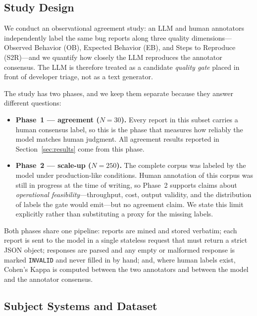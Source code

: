 \subsection{Study Design}
\label{sec:method:design}

We conduct an observational agreement study: an LLM and human
annotators independently label the same bug reports along three
quality dimensions---Observed Behavior (OB), Expected Behavior (EB),
and Steps to Reproduce (S2R)---and we quantify how closely the LLM
reproduces the annotator consensus. The LLM is therefore treated as a
candidate \emph{quality gate} placed in front of developer triage,
not as a text generator.

The study has two phases, and we keep them separate because they
answer different questions:

\begin{itemize}
  \item \textbf{Phase~1 --- agreement ($N=30$).} Every report in this
        subset carries a human consensus label, so this is the phase
        that measures how reliably the model matches human judgment.
        All agreement results reported in Section~\ref{sec:results}
        come from this phase.
  \item \textbf{Phase~2 --- scale-up ($N=250$).} The complete corpus
        was labeled by the model under production-like conditions.
        Human annotation of this corpus was still in progress at the
        time of writing, so Phase~2 supports claims about
        \emph{operational feasibility}---throughput, cost, output
        validity, and the distribution of labels the gate would
        emit---but no agreement claim. We state this limit explicitly
        rather than substituting a proxy for the missing labels.
\end{itemize}

Both phases share one pipeline: reports are mined and stored verbatim;
each report is sent to the model in a single stateless request that
must return a strict JSON object; responses are parsed and any empty or
malformed response is marked \texttt{INVALID} and never filled in by
hand; and, where human labels exist, Cohen's Kappa is computed between
the two annotators and between the model and the annotator consensus.

\subsection{Subject Systems and Dataset}
\label{sec:method:dataset}

